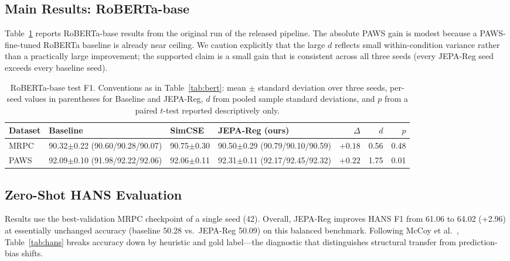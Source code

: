 \documentclass[sigconf]{acmart}
\begin{document}
\subsection{Main Results: RoBERTa-base}
Table~\ref{tab:roberta} reports RoBERTa-base results from the original run of the released pipeline. The absolute PAWS gain is modest because a PAWS-fine-tuned RoBERTa baseline is already near ceiling. We caution explicitly that the large $d$ reflects small within-condition variance rather than a practically large improvement; the supported claim is a small gain that is consistent across all three seeds (every JEPA-Reg seed exceeds every baseline seed).

\begin{table}[tbp]
\caption{RoBERTa-base test F1. Conventions as in Table~\ref{tab:bert}: mean $\pm$ standard deviation over three seeds, per-seed values in parentheses for Baseline and JEPA-Reg, $d$ from pooled sample standard deviations, and $p$ from a paired $t$-test reported descriptively only.}
\label{tab:roberta}
\begin{tabular}{llllrrr}
\toprule
Dataset & Baseline & SimCSE & JEPA-Reg (ours) & $\Delta$ & $d$ & $p$ \\
\midrule
MRPC & 90.32$\pm$0.22 (90.60/90.28/90.07) & 90.75$\pm$0.30 & 90.50$\pm$0.29 (90.79/90.10/90.59) & $+0.18$ & 0.56 & 0.48 \\
PAWS & 92.09$\pm$0.10 (91.98/92.22/92.06) & 92.06$\pm$0.11 & 92.31$\pm$0.11 (92.17/92.45/92.32) & $+0.22$ & 1.75 & 0.01 \\
\bottomrule
\end{tabular}
\end{table}

\subsection{Zero-Shot HANS Evaluation}
\label{sec:hans}
Results use the best-validation MRPC checkpoint of a single seed (42). Overall, JEPA-Reg improves HANS F1 from 61.06 to 64.02 (+2.96) at essentially unchanged accuracy (baseline 50.28 vs.\ JEPA-Reg 50.09) on this balanced benchmark. Following McCoy et al.~\cite{mccoy2019right}, Table~\ref{tab:hans} breaks accuracy down by heuristic and gold label---the diagnostic that distinguishes structural transfer from prediction-bias shifts.
\end{document}
